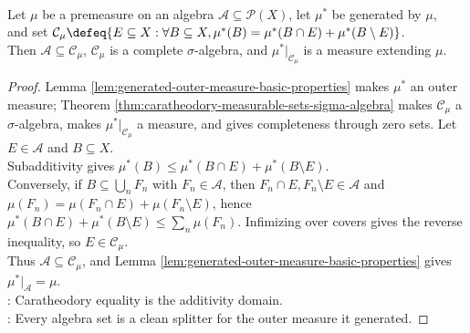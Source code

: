 \begin{theorem} \label{thm:generated-caratheodory-extension} \\
Let $\mu$ be a premeasure on an algebra $\mathcal{A}\subseteq\mathcal{P}(X)$, let $\mu^\ast$ be generated by $\mu$,\\
and set $\mathcal{C}_\mu\defeq\{E\subseteq X:\forall B\subseteq X, \mu^\ast(B)=\mu^\ast(B\cap E)+\mu^\ast(B\setminus E)\}$.\\
Then $\mathcal{A}\subseteq\mathcal{C}_\mu$, $\mathcal{C}_\mu$ is a complete $\sigma$-algebra, and $\mu^\ast|_{\mathcal{C}_\mu}$ is a measure extending $\mu$.
\begin{proof}
Lemma \ref{lem:generated-outer-measure-basic-properties} makes $\mu^\ast$ an outer measure; Theorem \ref{thm:caratheodory-measurable-sets-sigma-algebra} makes $\mathcal{C}_\mu$ a $\sigma$-algebra, makes $\mu^\ast|_{\mathcal{C}_\mu}$ a measure, and gives completeness through zero sets. Let $E\in\mathcal{A}$ and $B\subseteq X$.\\
Subadditivity gives $\mu^\ast(B)\leq\mu^\ast(B\cap E)+\mu^\ast(B\setminus E)$.\\
Conversely, if $B\subseteq\bigcup_nF_n$ with $F_n\in\mathcal{A}$, then $F_n\cap E,F_n\setminus E\in\mathcal{A}$ and $\mu(F_n)=\mu(F_n\cap E)+\mu(F_n\setminus E)$, hence $\mu^\ast(B\cap E)+\mu^\ast(B\setminus E)\leq\sum_n\mu(F_n)$. Infimizing over covers gives the reverse inequality, so $E\in\mathcal{C}_\mu$.\\
Thus $\mathcal{A}\subseteq\mathcal{C}_\mu$, and Lemma \ref{lem:generated-outer-measure-basic-properties} gives $\mu^\ast|_{\mathcal{A}}=\mu$.\\
: Caratheodory equality is the additivity domain.\\
: Every algebra set is a clean splitter for the outer measure it generated.
\end{proof}
\end{theorem}

